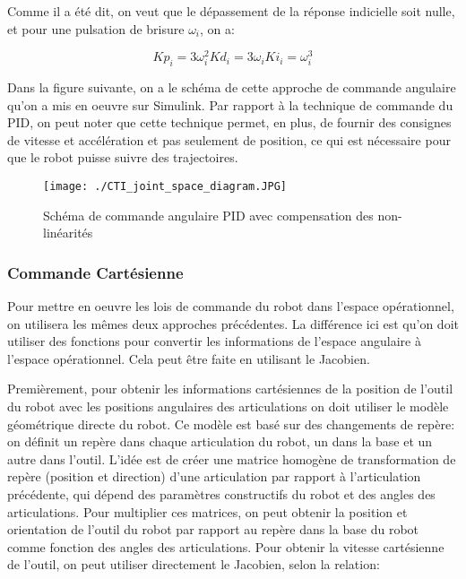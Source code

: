 Comme il a été dit, on veut que le dépassement de la réponse indicielle soit nulle, et pour une pulsation de brisure $ \omega_i $, on a:

\begin{subequations}
	\begin{equation}
		Kp_i = 3\omega_i^2
	\end{equation}
	\begin{equation}
		Kd_i = 3\omega_i
	\end{equation}
	\begin{equation}
		Ki_i = \omega_i^3
	\end{equation}
\end{subequations}



Dans la figure suivante, on a le schéma de cette approche de commande angulaire qu'on a mis en oeuvre sur Simulink. Par rapport à la technique de commande du PID, on peut noter que cette technique permet, en plus, de fournir des consignes de vitesse et accélération et pas seulement de position, ce qui est nécessaire pour que le robot puisse suivre des trajectoires.
\begin{figure}[H]
	\begin{center}	
		\texttt{[image: ./CTI\_joint\_space\_diagram.JPG]}
		\caption{Schéma de commande angulaire PID avec compensation des non-linéarités}
		\label{fig:CTI_joint_space_diagram}
	\end{center}
\end{figure}
\subsubsection{Commande Cartésienne}\label{Comm_Cart}

Pour mettre en oeuvre les lois de commande du robot dans l'espace opérationnel, on utilisera les mêmes deux approches précédentes. La différence ici est qu'on doit utiliser des fonctions pour convertir les informations de l'espace angulaire à l'espace opérationnel. Cela peut être faite en utilisant le Jacobien. 

Premièrement, pour obtenir les informations cartésiennes de la position de l'outil du robot avec les positions angulaires des articulations on doit utiliser le modèle géométrique directe du robot. Ce modèle est basé sur des changements de repère: on définit un repère dans chaque articulation du robot, un dans la base et un autre dans l'outil. L'idée est de créer une matrice homogène de transformation de repère (position et direction) d'une articulation par rapport à l'articulation précédente, qui dépend des paramètres constructifs du robot et des angles des articulations. Pour multiplier ces matrices, on peut obtenir la position et orientation de l'outil du robot par rapport au repère dans la base du robot comme fonction des angles des articulations. Pour obtenir la vitesse cartésienne de l'outil, on peut utiliser directement le Jacobien, selon la relation:

